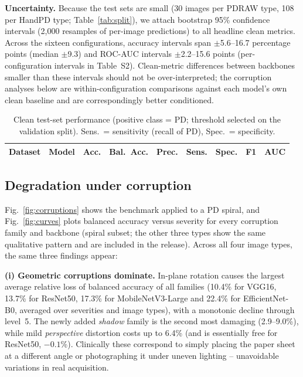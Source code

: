 \documentclass[11pt,a4paper]{article}
\begin{document}
\textbf{Uncertainty.} Because the test sets are small (30 images per PDRAW
type, 108 per HandPD type; Table~\ref{tab:split}), we attach bootstrap 95\%
confidence intervals (2{,}000 resamples of per-image predictions) to all
headline clean metrics. Across the sixteen configurations, accuracy intervals
span $\pm$5.6--16.7 percentage points (median $\pm$9.3) and ROC-AUC intervals
$\pm$2.2--15.6 points (per-configuration intervals in Table~S2). Clean-metric
differences between backbones smaller than these intervals should not be
over-interpreted; the corruption analyses below are within-configuration
comparisons against each model's own clean baseline and are correspondingly
better conditioned.

\begin{table}[t]
\centering\small
\caption{Clean test-set performance (positive class = PD; threshold selected
on the validation split). Sens.\ = sensitivity (recall of PD),
Spec.\ = specificity.}
\label{tab:clean}
\begin{tabular}{llccccccc}
\toprule
Dataset & Model & Acc. & Bal.\ Acc. & Prec. & Sens. & Spec. & F1 & AUC \\
\midrule

\bottomrule
\end{tabular}
\end{table}

\subsection{Degradation under corruption}
Fig.~\ref{fig:corruptions} shows the benchmark applied to a PD spiral, and
Fig.~\ref{fig:curves} plots balanced accuracy versus severity for every
corruption family and backbone (spiral subset; the other three types show the
same qualitative pattern and are included in the release). Across all four
image types, the same three findings appear:

\textbf{(i) Geometric corruptions dominate.} In-plane rotation causes the
largest average relative loss of balanced accuracy of all families (10.4\%
for VGG16, 13.7\% for ResNet50, 17.3\% for MobileNetV3-Large and 22.4\% for
EfficientNet-B0, averaged over severities and image types), with a monotonic
decline through level~5. The newly added \emph{shadow} family is the second
most damaging (2.9--9.0\%), while mild \emph{perspective} distortion costs
up to 6.4\% (and is essentially free for ResNet50, $-0.1$\%). Clinically
these correspond to simply placing the paper sheet at a different angle or
photographing it under uneven lighting -- unavoidable variations in real
acquisition.
\end{document}
